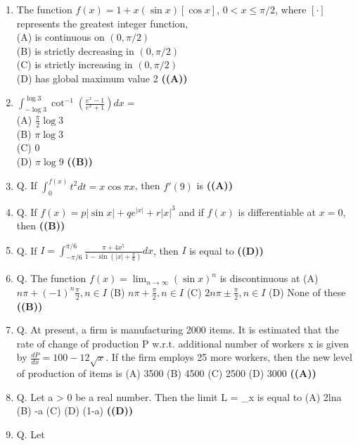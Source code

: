 \documentclass{article}
\begin{document}
\begin{enumerate}
(B) $\frac{1}{2(b^2-a^2)} \log\left|\frac{x^2-a^2}{x^2-b^2}\right|+c$\\
(C) $\frac{1}{2(a^2-b^2)} \log\left|\frac{x^2-b^2}{x^2-a^2}\right|+c$\\
(D) $\frac{1}{2(a^2-b^2)} \log\left|\frac{x^2-b^2}{x^2-a^2}\right|+c$ \hfill \textbf{((C))}
\item The function $f(x) = 1 + x(\sin x) [\cos x]$, $0 < x \le \pi/2$, where $[\cdot]$ represents the greatest integer function,\\
(A) is continuous on $(0, \pi/2)$\\
(B) is strictly decreasing in $(0, \pi/2)$\\
(C) is strictly increasing in $(0, \pi/2)$\\
(D) has global maximum value 2 \hfill \textbf{((A))}
\item $\int_{-\log 3}^{\log 3} \cot^{-1} (\frac{e^x-1}{e^x+1}) dx =$\\
(A) $\frac{\pi}{2} \log 3$\\
(B) $\pi\log 3$\\
(C) $0$\\
(D) $\pi\log 9$ \hfill \textbf{((B))}
\item Q. If $\int_{0}^{f(x)} t^2dt = x \cos \pi x$, then $f'(9)$ is \hfill \textbf{((A))}
\item Q. If $f(x) = p|\sin x| + qe^{|x|} + r|x|^3$ and if $f(x)$ is differentiable at $x = 0$, then \hfill \textbf{((B))}
\item Q. If $I = \int_{-\pi/6}^{\pi/6} \frac{\pi+4x^5}{1-\sin(|x|+\frac{\pi}{6})} dx$, then $I$ is equal to \hfill \textbf{((D))}
\item Q. The function $f(x) = \lim_{n\to\infty}(\sin x)^n$ is discontinuous at
(A) $n\pi + (-1)^n\frac{\pi}{2}, n \in I$
(B) $n\pi + \frac{\pi}{2}, n \in I$
(C) $2n\pi\pm\frac{\pi}{2}, n \in I$
(D) None of these \hfill \textbf{((B))}
\item Q. At present, a firm is manufacturing 2000 items. It is estimated that the rate of change of production P w.r.t. additional number of workers x is given by $\frac{dP}{dx} = 100 - 12\sqrt{x}$. If the firm employs 25 more workers, then the new level of production of items is
(A) 3500
(B) 4500
(C) 2500
(D) 3000 \hfill \textbf{((A))}
\item Q. Let a > 0 be a real number. Then the limit
L = \lim_{x} 
is equal to
(A) 2lna
(B) -a
(C) 
(D) (1-a) \hfill \textbf{((D))}
\item Q. Let

\end{enumerate}
\end{document}

